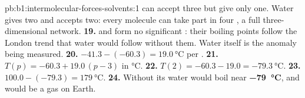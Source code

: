 \begin{solution}{pb:b1:intermolecular-forces-solvents:1}
 can accept three but give only one. Water gives two and accepts
two: every molecule can take part in four , a full
three-dimensional network.
\textbf{19.}  and  form no significant :
their boiling points follow the London trend that water would follow
without them. Water itself is the anomaly being measured.
\textbf{20.} $-41.3 - (-60.3) = \qty{19.0}{\celsius}$ per .
\textbf{21.} $T(p) = -60.3 + 19.0\,(p - 3)$ in \unit{\celsius}.
\textbf{22.} $T(2) = -60.3 - 19.0 = \qty{-79.3}{\celsius}$.
\textbf{23.} $100.0 - (-79.3) = \qty{179}{\celsius}$.
\textbf{24.} Without its  water would boil near
\textbf{\qty{-79}{\celsius}}, and would be a gas on Earth.
\end{solution}
